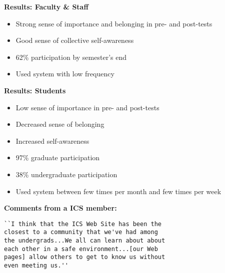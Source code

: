 \begin{slide}\Huge 
  {\bf Results: Faculty \& Staff}
  \horizontalline
  \begin{itemize}
  \item Strong sense of importance and belonging in pre- and post-tests

  \item Good sense of collective self-awareness

  \item 62\% participation by semester's end

  \item Used system with low frequency
  \end{itemize}
\end{slide}\Huge 

\begin{slide}\Huge 
  {\bf Results: Students}
  \horizontalline
  \begin{itemize}
  \item Low sense of importance in pre- and post-tests

  \item Decreased sense of belonging

  \item Increased self-awareness

  \item 97\% graduate participation

  \item 38\% undergraduate participation

  \item Used system between few times per month and few times per week
  \end{itemize}

\end{slide}\Huge 

\begin{slide}\Huge 
  {\bf Comments from a ICS member:}
  \horizontalline
  \begin{verbatim}
``I think that the ICS Web Site has been the
closest to a community that we've had among
the undergrads...We all can learn about about
each other in a safe environment...[our Web 
pages] allow others to get to know us without
even meeting us.''
  \end{verbatim}
\end{slide}\Huge 

